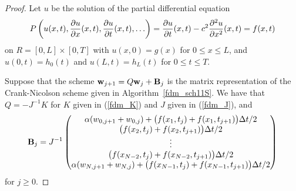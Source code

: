 \begin{proof}
Let $u$ be the solution of the partial differential equation
\[
P\left(u(x,t), \frac{\partial{u}}{\partial{x}}(x,t), \frac{\partial{u}}{\partial{t}}(x,t), \ldots\right) =
\frac{\partial{u}}{\partial{t}}(x,t) - c^2 \frac{\partial^{2}{u}}{\partial{x}^{2}}(x,t) = f(x,t)
\]
on $R=[0,L]\times [0,T]$ with $u(x,0) = g(x)$ for $0\leq x \leq L$, and
$u(0,t) = h_0(t)$ and $u(L,t) = h_L(t)$ for $0\leq t \leq T$.

Suppose that the scheme $\mathbf{w}_{j+1} = Q\mathbf{w}_j + \mathbf{B}_j$ is
the matrix representation of the Crank-Nicolson scheme given in
Algorithm~\ref{fdm_sch11S}.  We have that $Q = -J^{-1}K$ for $K$ given
in (\ref{fdm_K}) and $J$ given in (\ref{fdm_J}), and 
\[
\mathbf{B}_j = J^{-1} \begin{pmatrix}
\alpha (w_{0,j+1} + w_{0,j})
+ \big( f(x_1,t_j) + f(x_1,t_{j+1})\big)\Delta{t}/2 \\
\big( f(x_2,t_j)  + f(x_2,t_{j+1})\big)\Delta{t}/2 \\
\vdots \\
\big( f(x_{N-2},t_j) + f(x_{N-2},t_{j+1})\big)\Delta{t}/2 \\
\alpha (w_{N,j+1} + w_{N,j})
+ \big( f(x_{N-1},t_j) + f(x_{N-1},t_{j+1})\big)\Delta{t}/2
\end{pmatrix}
\]
for $j\geq 0$.


\end{proof}
